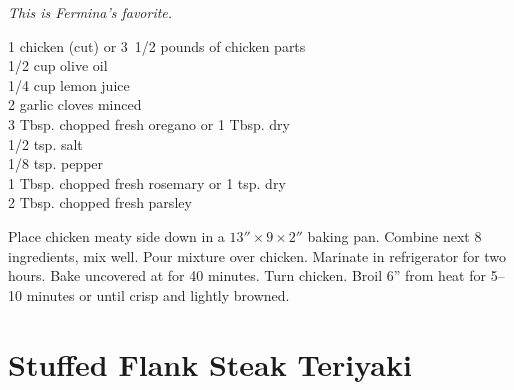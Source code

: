 \textit{This is Fermina's favorite.}
\begin{ingredients}
1 chicken (cut) or 3\ 1/2 pounds of chicken parts \\
1/2 cup olive oil \\
1/4 cup lemon juice \\
2 garlic cloves minced \\
3 Tbsp. chopped fresh oregano or 1 Tbsp. dry \\
1/2 tsp. salt \\
1/8 tsp. pepper \\
1 Tbsp. chopped fresh rosemary or 1 tsp. dry \\
2 Tbsp. chopped fresh parsley
\end{ingredients} 
Place chicken meaty side down in a $13''\times 9\times 2''$ baking pan.  
Combine next 8
ingredients, mix well.  Pour mixture over chicken.  Marinate in refrigerator
for two hours.  Bake uncovered at  for 40 minutes.  Turn chicken. 
Broil 6'' from heat for 5--10 minutes or until crisp and lightly browned.

\section{Stuffed Flank Steak Teriyaki}

